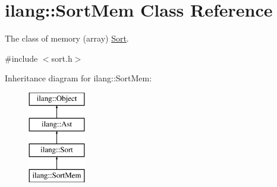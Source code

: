 \hypertarget{classilang_1_1_sort_mem}{}\section{ilang\+:\+:Sort\+Mem Class Reference}
\label{classilang_1_1_sort_mem}


The class of memory (array) \mbox{\hyperlink{classilang_1_1_sort}{Sort}}.  




{\ttfamily \#include $<$sort.\+h$>$}

Inheritance diagram for ilang\+:\+:Sort\+Mem\+:\begin{figure}[H]
\begin{center}
\leavevmode
\includegraphics[height=4.000000cm]{classilang_1_1_sort_mem}
\end{center}
\end{figure}
